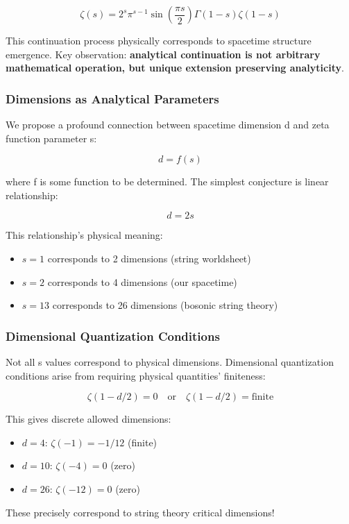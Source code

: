 \documentclass[12pt,a4paper]{article}
\begin{document}
$$\zeta(s) = 2^s \pi^{s-1} \sin\left(\frac{\pi s}{2}\right) \Gamma(1-s) \zeta(1-s)$$

This continuation process physically corresponds to spacetime structure emergence. Key observation: \textbf{analytical continuation is not arbitrary mathematical operation, but unique extension preserving analyticity}.

\subsubsection{Dimensions as Analytical Parameters}

We propose a profound connection between spacetime dimension d and zeta function parameter s:

$$d = f(s)$$

where f is some function to be determined. The simplest conjecture is linear relationship:

$$d = 2s$$

This relationship's physical meaning:
\begin{itemize}
\item $s = 1$ corresponds to 2 dimensions (string worldsheet)
\item $s = 2$ corresponds to 4 dimensions (our spacetime)
\item $s = 13$ corresponds to 26 dimensions (bosonic string theory)
\end{itemize}

\subsubsection{Dimensional Quantization Conditions}

Not all s values correspond to physical dimensions. Dimensional quantization conditions arise from requiring physical quantities' finiteness:

$$\zeta(1 - d/2) = 0 \quad \text{or} \quad \zeta(1 - d/2) = \text{finite}$$

This gives discrete allowed dimensions:
\begin{itemize}
\item $d = 4$: $\zeta(-1) = -1/12$ (finite)
\item $d = 10$: $\zeta(-4) = 0$ (zero)
\item $d = 26$: $\zeta(-12) = 0$ (zero)
\end{itemize}

These precisely correspond to string theory critical dimensions!
\end{document}
